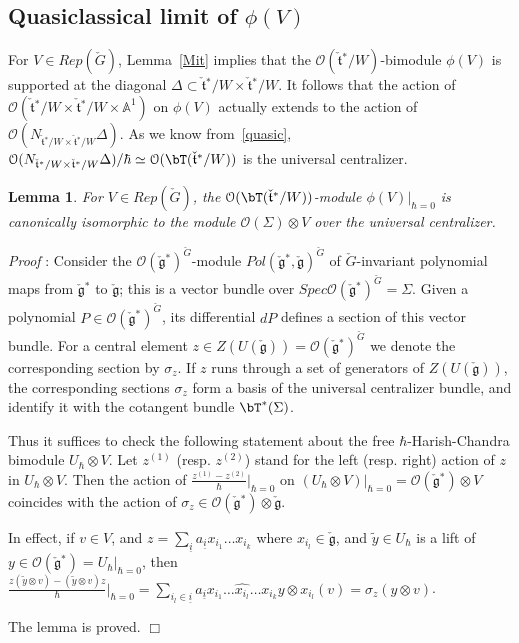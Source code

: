 \documentclass[11pt]{amsart}
\newtheorem{lem}{Lemma}
\theoremstyle{definition}
\theoremstyle{remark}
\renewcommand{\O}{{\mathcal O}}
\theoremstyle{remark}
\newcommand{\cal}{\mathcal}
\newcommand{\<}{\langle}
\renewcommand{\>}{\rangle}
\newcommand{\Lg}{\check{\mathfrak g}{}}
\newcommand{\Lt}{\check{\mathfrak t}{}}
\newcommand{\LG}{{\check{G}}}
\renewcommand{\O}{{\cal O}}
\newcommand{\Aone}{{\mathbb A}^1}
\renewcommand{\proof}{{\it Proof }}
\begin{document}
\subsection{Quasiclassical limit of $\phi(V)$}
\label{secr}
For $V\in Rep(\LG)$, Lemma~\ref{Mit} implies that the $\O(\Lt^*/W)$-bimodule 
$\phi(V)$ is supported at the diagonal $\Delta\subset\Lt^*/W\times\Lt^*/W$.
It follows that the action of $\O(\Lt^*/W\times\Lt^*/W\times\Aone)$ on 
$\phi(V)$ actually extends to the action of
$\O(N_{\Lt^*/W\times\Lt^*/W}\Delta)$. As we know from~\ref{quasic},
$\O(N_{\Lt^*/W\times\Lt^*/W}\Delta)/\hbar\simeq\O(\bT(\Lt^*/W))$ is the 
universal centralizer.

\begin{lem}
\label{MIt}
For $V\in Rep(\LG)$, the $\O(\bT(\Lt^*/W))$-module $\phi(V)|_{\hbar=0}$
is canonically isomorphic to the module $\O(\Sigma)\otimes V$ over the
universal centralizer.
\end{lem}

\proof: Consider the $\O(\Lg^*)^{\LG}$-module $Pol(\Lg^*,\Lg)^{\LG}$ of
$\LG$-invariant polynomial maps from $\Lg^*$ to $\Lg$; this is a vector
bundle over $Spec\O(\Lg^*)^{\LG}=\Sigma$. Given a polynomial 
$P\in\O(\Lg^*)^{\LG}$, its differential $dP$ defines a section of this
vector bundle. 
For a central element $z\in Z(U(\Lg))=\O(\Lg^*)^{\LG}$ we denote the
corresponding section by $\sigma_z$.
If $z$ runs through a set of generators of $Z(U(\Lg))$, the corresponding
sections $\sigma_z$ form a basis of the universal centralizer bundle,
and identify it with the cotangent bundle $\bT^*(\Sigma)$.

Thus it suffices to check the following statement about the free
$\hbar$-Harish-Chandra bimodule $U_\hbar\otimes V$. Let $z^{(1)}$
(resp. $z^{(2)}$) stand for the left (resp. right) action of $z$ in
$U_\hbar\otimes V$. Then the action of 
$\frac{z^{(1)}-z^{(2)}}{\hbar}|_{\hbar=0}$ on $(U_\hbar\otimes V)|_{\hbar=0}=
\O(\Lg^*)\otimes V$ coincides with the action of $\sigma_z\in
\O(\Lg^*)\otimes\Lg$.

In effect, if $v\in V$, and $z=\sum_{\underline{i}} 
a_{\underline{i}}x_{i_1}\ldots x_{i_k}$ where $x_{i_l}\in\Lg$, 
and $\tilde{y}\in U_\hbar$ is a lift of $y\in\O(\Lg^*)=U_\hbar|_{\hbar=0}$,
then $\frac{z(\tilde{y}\otimes v)-(\tilde{y}\otimes v)z}{\hbar}|_{\hbar=0}=
\sum_{i_l\in\underline{i}}
a_{\underline{i}}x_{i_1}\ldots\widehat{x_{i_l}}\ldots 
x_{i_k}y\otimes x_{i_l}(v)=\sigma_z(y\otimes v)$.

The lemma is proved. 
\hfill $\Box$
\end{document}
